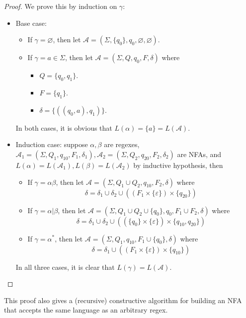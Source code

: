 \documentclass[titlepage]{article}
\theoremstyle{plain}
\theoremstyle{definition}
\theoremstyle{remark}
\begin{document}
\begin{proof}
  We prove this by induction on $\gamma$:
  \begin{itemize}
    \item Base case:
      \begin{itemize}
        \item If $\gamma=\varnothing$, then let $\mathcal{A}=(\Sigma,\{q_0\},
          q_0,\varnothing,\varnothing)$.
        \item If $\gamma=a\in\Sigma$, then let $\mathcal{A}=(\Sigma,Q,q_0,F,
          \delta)$ where
          \begin{itemize}
            \item $Q=\{q_0,q_1\}$.
            \item $F=\{q_1\}$.
            \item $\delta=\{((q_0,a),q_1)\}$.
          \end{itemize}
      \end{itemize}
      In both cases, it is obvious that $L(\alpha)=\{a\}=L(\mathcal{A})$.
    \item Induction case: suppose $\alpha,\beta$ are regexes, $\mathcal{A}_1
      =(\Sigma,Q_1,q_{10},F_1,\delta_1), \mathcal{A}_2=(\Sigma,Q_2,q_{20},F_2,
      \delta_2)$ are NFAs, and $L(\alpha)=L(\mathcal{A}_1),L(\beta)=
      L(\mathcal{A}_2)$ by inductive hypothesis, then
      \begin{itemize}
        \item If $\gamma=\alpha\beta$, then let $\mathcal{A}=(\Sigma,
          Q_1\cup Q_2,q_{10},F_2,\delta)$ where
          \[
            \delta=\delta_1\cup\delta_2\cup((F_1\times\{\varepsilon\})
            \times\{q_{20}\})
          \]
        \item If $\gamma=\alpha|\beta$, then let $\mathcal{A}=(\Sigma,
          Q_1\cup Q_2\cup\{q_0\},q_{0},F_1\cup F_2,\delta)$ where
          \[
            \delta=\delta_1\cup\delta_2\cup((\{q_0\}\times\{\varepsilon\})
            \times\{q_{10},q_{20}\})
          \]
        \item If $\gamma=\alpha^*$, then let $\mathcal{A}=(\Sigma,
          Q_1,q_{10},F_1\cup\{q_0\},\delta)$ where
          \[
            \delta=\delta_1\cup((F_1\times\{\varepsilon\})\times\{q_{10}\})
          \]
      \end{itemize}
      In all three cases, it is clear that $L(\gamma)=L(\mathcal{A})$.
  \end{itemize}
\end{proof}
This proof also gives a (recursive) constructive algorithm for building an
NFA that accepts the same language as an arbitrary regex.
\end{document}
